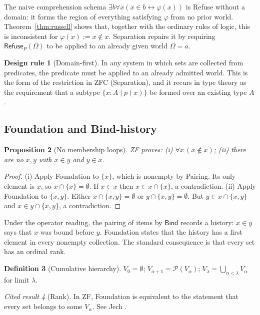 \documentclass[11pt]{article}
\newcommand{\Refuse}{\mathsf{Refuse}}
\newcommand{\Bind}{\mathsf{Bind}}
\newcommand{\Om}{\Omega}
\newcommand{\Pow}{\mathcal{P}}
\theoremstyle{definition}
\newtheorem{definition}{Definition}[section]
\newtheorem{designrule}[definition]{Design rule}
\theoremstyle{plain}
\newtheorem{proposition}[definition]{Proposition}
\theoremstyle{remark}
\newtheorem{cited}[definition]{Cited result}
\begin{document}
The naive comprehension schema $\exists b\forall x(x\in b\leftrightarrow\varphi(x))$ is Refuse without a domain: it forms the region of everything satisfying $\varphi$ from no prior world. Theorem~\ref{thm:russell} shows that, together with the ordinary rules of logic, this is inconsistent for $\varphi(x):=x\notin x$. Separation repairs it by requiring $\Refuse_P(\Om)$ to be applied to an already given world $\Om=a$.

\begin{designrule}[Domain-first]\label{dr:domainfirst}
In any system in which sets are collected from predicates, the predicate must be applied to an already admitted world. This is the form of the restriction in ZFC (Separation), and it recurs in type theory as the requirement that a subtype $\{x:A\mid p(x)\}$ be formed over an existing type $A$.
\end{designrule}

\subsection{Foundation and Bind-history}

\begin{proposition}[No membership loops]\label{prop:found}
ZF proves: (i) $\forall x\,(x\notin x)$; (ii) there are no $x,y$ with $x\in y$ and $y\in x$.
\end{proposition}
\begin{proof}
(i) Apply Foundation to $\{x\}$, which is nonempty by Pairing. Its only element is $x$, so $x\cap\{x\}=\emptyset$. If $x\in x$ then $x\in x\cap\{x\}$, a contradiction. (ii) Apply Foundation to $\{x,y\}$. Either $x\cap\{x,y\}=\emptyset$ or $y\cap\{x,y\}=\emptyset$. But $y\in x\cap\{x,y\}$ and $x\in y\cap\{x,y\}$, a contradiction.
\end{proof}

Under the operator reading, the pairing of items by $\Bind$ records a history: $x\in y$ says that $x$ was bound before $y$. Foundation states that the history has a first element in every nonempty collection. The standard consequence is that every set has an ordinal rank.

\begin{definition}[Cumulative hierarchy]\label{def:cumul}
$V_0=\emptyset$; $V_{\alpha+1}=\Pow(V_\alpha)$; $V_\lambda=\bigcup_{\alpha<\lambda}V_\alpha$ for limit $\lambda$.
\end{definition}

\begin{cited}[Rank]\label{cit:rank}
In ZF, Foundation is equivalent to the statement that every set belongs to some $V_\alpha$. See Jech \cite[Ch.~6]{Jech03}.
\end{cited}
\end{document}
